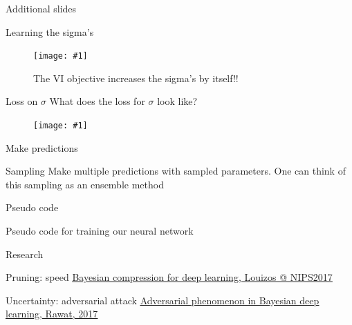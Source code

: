 \documentclass{beamer}
\newcommand{\fitfigure}[1]{\centering\texttt{[image: \#1]}}
\newcommand{\mdlink}[2]{\href{#2}{\underline{#1}}}
\begin{document}
\begin{frame}
	\centerline{\Huge{Additional slides}}
\end{frame}

\begin{frame}{Learning the sigma's}
	\begin{figure}
		\fitfigure{/home/rob/Dropbox/ml_projects/weight_uncertainty/weight_uncertainty/im/tensorboard_sample_sigma_pruning.png}
		\caption{The VI objective increases the sigma's by itself!!}
	\end{figure}
		
\end{frame}

\begin{frame}{Loss on $\sigma$}
	What does the loss for $\sigma$ look like?
	\begin{figure}
		\fitfigure{/home/rob/Dropbox/ml_projects/weight_uncertainty/weight_uncertainty/im/loss_sigma.png}
	\end{figure}
\end{frame}

\begin{frame}{Make predictions}
	\begin{block}{Sampling}
		Make multiple predictions with sampled parameters. 
		One can think of this sampling as an ensemble method
	\end{block}   
	
\end{frame}


\begin{frame}[shrink=30]{Pseudo code}
	\centerline{Pseudo code for training our neural network}
	
\end{frame}

\begin{frame}[shrink=10]
	
\end{frame}

\begin{frame}{Research}
	\begin{block}{Pruning: speed}
		\mdlink{Bayesian compression for deep learning, Louizos @ NIPS2017}{http://papers.nips.cc/paper/6921-bayesian-compression-for-deep-learning.pdf}
	\end{block}
		
	\begin{block}{Uncertainty: adversarial attack}
		\mdlink{Adversarial phenomenon in Bayesian deep learning, Rawat, 2017}{https://arxiv.org/pdf/1711.08244.pdf}
	\end{block}
\end{frame}
\end{document}
